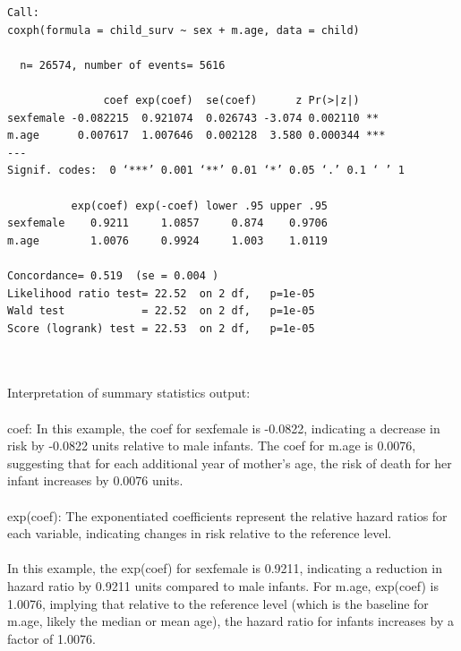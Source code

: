 \documentclass[12pt,letterpaper]{article}
\begin{document}

\begin{verbatim}
Call:
coxph(formula = child_surv ~ sex + m.age, data = child)

  n= 26574, number of events= 5616 

               coef exp(coef)  se(coef)      z Pr(>|z|)    
sexfemale -0.082215  0.921074  0.026743 -3.074 0.002110 ** 
m.age      0.007617  1.007646  0.002128  3.580 0.000344 ***
---
Signif. codes:  0 ‘***’ 0.001 ‘**’ 0.01 ‘*’ 0.05 ‘.’ 0.1 ‘ ’ 1

          exp(coef) exp(-coef) lower .95 upper .95
sexfemale    0.9211     1.0857     0.874    0.9706
m.age        1.0076     0.9924     1.003    1.0119

Concordance= 0.519  (se = 0.004 )
Likelihood ratio test= 22.52  on 2 df,   p=1e-05
Wald test            = 22.52  on 2 df,   p=1e-05
Score (logrank) test = 22.53  on 2 df,   p=1e-05
\end{verbatim}
\\\\
Interpretation of summary statistics output:\\\\
coef: In this example, the coef for sexfemale is -0.0822, indicating a decrease in risk by -0.0822 units relative to male infants. The coef for m.age is 0.0076, suggesting that for each additional year of mother's age, the risk of death for her infant increases by 0.0076 units.\\\\
exp(coef): The exponentiated coefficients represent the relative hazard ratios for each variable, indicating changes in risk relative to the reference level.\\\\
In this example, the exp(coef) for sexfemale is 0.9211, indicating a reduction in hazard ratio by 0.9211 units compared to male infants. For m.age, exp(coef) is 1.0076, implying that relative to the reference level (which is the baseline for m.age, likely the median or mean age), the hazard ratio for infants increases by a factor of 1.0076.
\end{document}
